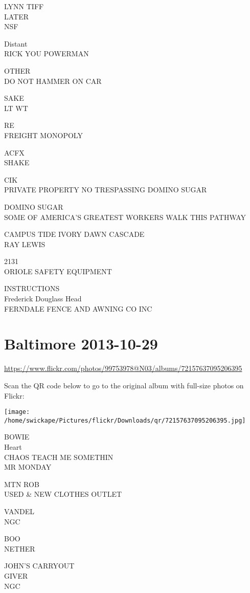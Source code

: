 \documentclass[10pt,letterpaper]{article}
\begin{document}
LYNN TIFF\\
LATER\\
NSF

Distant\\
RICK YOU POWERMAN

OTHER\\
DO NOT HAMMER ON CAR

SAKE\\
LT WT

RE\\
FREIGHT MONOPOLY

ACFX\\
SHAKE

CIK\\
PRIVATE PROPERTY NO TRESPASSING DOMINO SUGAR

DOMINO SUGAR\\
SOME OF AMERICA'S GREATEST WORKERS WALK THIS PATHWAY

CAMPUS TIDE IVORY DAWN CASCADE\\
RAY LEWIS

2131\\
ORIOLE SAFETY EQUIPMENT

INSTRUCTIONS\\
Frederick Douglass Head\\
FERNDALE FENCE AND AWNING CO INC
\pagebreak

\section*{Baltimore 2013-10-29}

\url{https://www.flickr.com/photos/99753978@N03/albums/72157637095206395}

Scan the QR code below to go to the original album with full-size photos on Flickr:

\texttt{[image: /home/swickape/Pictures/flickr/Downloads/qr/72157637095206395.jpg]}
\pagebreak

BOWIE\\
Heart\\
CHAOS TEACH ME SOMETHIN\\
MR MONDAY

MTN ROB\\
USED \& NEW CLOTHES OUTLET

VANDEL\\
NGC

BOO\\
NETHER

JOHN'S CARRYOUT\\
GIVER\\
NGC
\end{document}
